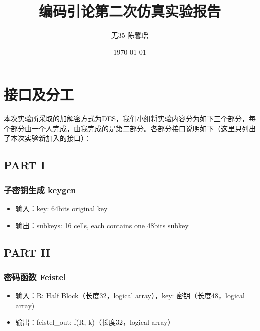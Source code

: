 \documentclass[UTF8]{ctexart}
\title{\vspace*{6cm}编码引论第二次仿真实验报告}
\author{无35 \quad 陈馨瑶 \quad 2013011166}
\date{\today}
\begin{document}
\begin{titlepage}
\maketitle

\thispagestyle{empty}
\end{titlepage}

\setlength{\headheight}{13pt}

\tableofcontents

\newpage

\section{接口及分工}

本次实验所采取的加解密方式为DES，我们小组将实验内容分为如下三个部分，每个部分由一个人完成，由我完成的是第二部分。各部分接口说明如下（这里只列出了本次实验新加入的接口）：

\subsection{PART I}

\subsubsection{子密钥生成 keygen}
\begin{itemize}
        \item 输入：key: 64bits original key
        \item 输出：subkeys: 16 cells, each contains one 48bits subkey
\end{itemize}

\subsection{PART II}

\subsubsection{密码函数 Feistel}

\begin{itemize}
        \item 输入：R: Half Block（长度32，logical array），key: 密钥（长度48，logical array)
        \item 输出：feistel\_out: f(R, k)（长度32，logical array）
\end{itemize}
\end{document}
